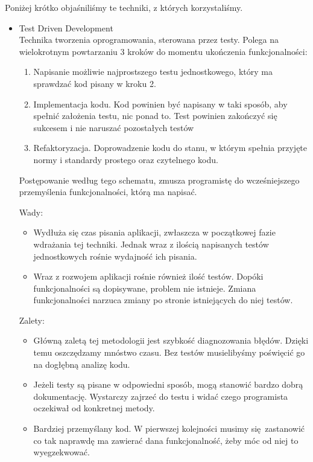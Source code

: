     Poniżej krótko objaśniliśmy te techniki, z których korzystaliśmy.
    \begin{itemize}
      \item Test Driven Development\cite{tdd} \\
        Technika tworzenia oprogramowania, sterowana przez testy. Polega na wielokrotnym powtarzaniu 3 kroków do momentu ukończenia funkcjonalności:
        \begin{enumerate}
          \item Napisanie możliwie najprostszego testu jednostkowego, który ma sprawdzać kod pisany w kroku 2.
          \item Implementacja kodu. Kod powinien być napisany w taki sposób, aby spełnić założenia testu, nic ponad to. Test powinien zakończyć się sukcesem i nie naruszać pozostałych testów
          \item Refaktoryzacja. Doprowadzenie kodu do stanu, w którym spełnia przyjęte normy i standardy prostego oraz czytelnego kodu\cite{scs}.
        \end{enumerate}

        Postępowanie według tego schematu, zmusza programistę do wcześniejszego przemyślenia funkcjonalności, którą ma napisać.

        Wady:
        \begin{itemize}
          \item Wydłuża się czas pisania aplikacji, zwłaszcza w początkowej fazie wdrażania tej techniki. Jednak wraz z ilością napisanych testów jednostkowych rośnie wydajność ich pisania.
          \item Wraz z rozwojem aplikacji rośnie również ilość testów. Dopóki funkcjonalności są dopisywane, problem nie istnieje. Zmiana funkcjonalności narzuca zmiany po stronie istniejących do niej testów.
        \end{itemize}

        Zalety:
        \begin{itemize}
          \item Główną zaletą tej metodologii jest szybkość diagnozowania błędów. Dzięki temu oszczędzamy mnóstwo czasu. Bez testów musielibyśmy poświęcić go na dogłębną analizę kodu.
          \item Jeżeli testy są pisane w odpowiedni sposób, mogą stanowić bardzo dobrą dokumentację. Wystarczy zajrzeć do testu i widać czego programista oczekiwał od konkretnej metody.
          \item Bardziej przemyślany kod. W pierwszej kolejności musimy się zastanowić co tak naprawdę ma zawierać dana funkcjonalność, żeby móc od niej to wyegzekwować.
        \end{itemize}


\end{itemize}
